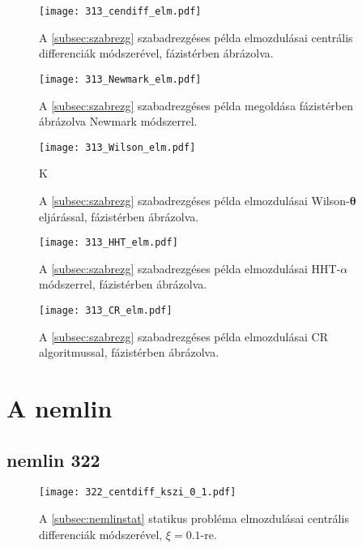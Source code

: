 \begin{figure}[H]
\centering
\texttt{[image: 313\_cendiff\_elm.pdf]}
\caption{A \ref{subsec:szabrezg} szabadrezgéses példa elmozdulásai centrális differenciák módszerével, fázistérben ábrázolva.}
\end{figure}

\begin{figure}[H]
\centering
\texttt{[image: 313\_Newmark\_elm.pdf]}
\caption{A \ref{subsec:szabrezg} szabadrezgéses példa megoldása fázistérben ábrázolva Newmark módszerrel.}
\end{figure}

\begin{figure}[H]
\centering
\texttt{[image: 313\_Wilson\_elm.pdf]}
\caption{A \ref{subsec:szabrezg} szabadrezgéses példa elmozdulásai Wilson-$\boldsymbol\theta$ eljárással, fázistérben ábrázolva.}
K\label{fig:szabrezg_er_wilson}
\end{figure}

\begin{figure}[H]
\centering
\texttt{[image: 313\_HHT\_elm.pdf]}
\caption{A \ref{subsec:szabrezg} szabadrezgéses példa elmozdulásai HHT-$\alpha$ módszerrel, fázistérben ábrázolva.}
\end{figure}

\begin{figure}[H]
\centering
\texttt{[image: 313\_CR\_elm.pdf]}
\caption{A \ref{subsec:szabrezg} szabadrezgéses példa elmozdulásai CR algoritmussal, fázistérben ábrázolva.}
\end{figure}

\section{A nemlin}

\subsection{nemlin 322}\label{sec:függ 322}


\begin{figure}[p]
\centering
\texttt{[image: 322\_centdiff\_kszi\_0\_1.pdf]}
\caption{A \ref{subsec:nemlinstat} statikus probléma elmozdulásai centrális differenciák módszerével, $\xi = 0.1$-re.}
\label{fig:322_centdiff_0_1}
\end{figure}

